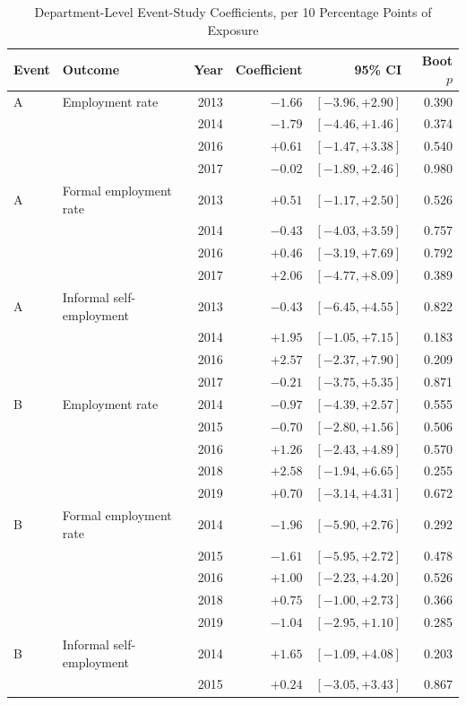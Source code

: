 \begin{table}[H]
\centering
\caption{Department-Level Event-Study Coefficients, per 10 Percentage Points of Exposure}
\label{tab:es_coefs}
\small
\begin{tabular}{llrrrr}
\toprule
Event & Outcome & Year & Coefficient & 95\% CI & Boot $p$ \\
\midrule
A & Employment rate & 2013 & $-1.66$ & $[-3.96, +2.90]$ & 0.390 \\
 &  & 2014 & $-1.79$ & $[-4.46, +1.46]$ & 0.374 \\
 &  & 2016 & $+0.61$ & $[-1.47, +3.38]$ & 0.540 \\
 &  & 2017 & $-0.02$ & $[-1.89, +2.46]$ & 0.980 \\
A & Formal employment rate & 2013 & $+0.51$ & $[-1.17, +2.50]$ & 0.526 \\
 &  & 2014 & $-0.43$ & $[-4.03, +3.59]$ & 0.757 \\
 &  & 2016 & $+0.46$ & $[-3.19, +7.69]$ & 0.792 \\
 &  & 2017 & $+2.06$ & $[-4.77, +8.09]$ & 0.389 \\
A & Informal self-employment & 2013 & $-0.43$ & $[-6.45, +4.55]$ & 0.822 \\
 &  & 2014 & $+1.95$ & $[-1.05, +7.15]$ & 0.183 \\
 &  & 2016 & $+2.57$ & $[-2.37, +7.90]$ & 0.209 \\
 &  & 2017 & $-0.21$ & $[-3.75, +5.35]$ & 0.871 \\
B & Employment rate & 2014 & $-0.97$ & $[-4.39, +2.57]$ & 0.555 \\
 &  & 2015 & $-0.70$ & $[-2.80, +1.56]$ & 0.506 \\
 &  & 2016 & $+1.26$ & $[-2.43, +4.89]$ & 0.570 \\
 &  & 2018 & $+2.58$ & $[-1.94, +6.65]$ & 0.255 \\
 &  & 2019 & $+0.70$ & $[-3.14, +4.31]$ & 0.672 \\
B & Formal employment rate & 2014 & $-1.96$ & $[-5.90, +2.76]$ & 0.292 \\
 &  & 2015 & $-1.61$ & $[-5.95, +2.72]$ & 0.478 \\
 &  & 2016 & $+1.00$ & $[-2.23, +4.20]$ & 0.526 \\
 &  & 2018 & $+0.75$ & $[-1.00, +2.73]$ & 0.366 \\
 &  & 2019 & $-1.04$ & $[-2.95, +1.10]$ & 0.285 \\
B & Informal self-employment & 2014 & $+1.65$ & $[-1.09, +4.08]$ & 0.203 \\
 &  & 2015 & $+0.24$ & $[-3.05, +3.43]$ & 0.867 \\

\end{tabular}
\end{table}
